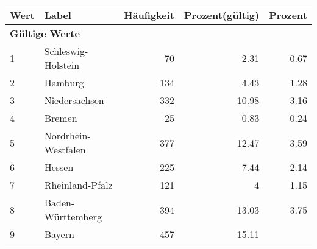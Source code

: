      \begin{longtable}{lXrrr}
     \toprule
     \textbf{Wert} & \textbf{Label} & \textbf{Häufigkeit} & \textbf{Prozent(gültig)} & \textbf{Prozent} \\
     \endhead
     \midrule
     \multicolumn{5}{l}{\textbf{Gültige Werte}}\\
        1 & \multicolumn{1}{X}{Schleswig-Holstein} & %
          \num{70} &
          \num[round-mode=places,round-precision=2]{2.31} &
          \num[round-mode=places,round-precision=2]{0.67} \\
        2 & \multicolumn{1}{X}{Hamburg} & %
          \num{134} &
          \num[round-mode=places,round-precision=2]{4.43} &
          \num[round-mode=places,round-precision=2]{1.28} \\
        3 & \multicolumn{1}{X}{Niedersachsen} & %
          \num{332} &
          \num[round-mode=places,round-precision=2]{10.98} &
          \num[round-mode=places,round-precision=2]{3.16} \\
        4 & \multicolumn{1}{X}{Bremen} & %
          \num{25} &
          \num[round-mode=places,round-precision=2]{0.83} &
          \num[round-mode=places,round-precision=2]{0.24} \\
        5 & \multicolumn{1}{X}{Nordrhein-Westfalen} & %
          \num{377} &
          \num[round-mode=places,round-precision=2]{12.47} &
          \num[round-mode=places,round-precision=2]{3.59} \\
        6 & \multicolumn{1}{X}{Hessen} & %
          \num{225} &
          \num[round-mode=places,round-precision=2]{7.44} &
          \num[round-mode=places,round-precision=2]{2.14} \\
        7 & \multicolumn{1}{X}{Rheinland-Pfalz} & %
          \num{121} &
          \num[round-mode=places,round-precision=2]{4} &
          \num[round-mode=places,round-precision=2]{1.15} \\
        8 & \multicolumn{1}{X}{Baden-Württemberg} & %
          \num{394} &
          \num[round-mode=places,round-precision=2]{13.03} &
          \num[round-mode=places,round-precision=2]{3.75} \\
        9 & \multicolumn{1}{X}{Bayern} & %
          \num{457} &
          \num[round-mode=places,round-precision=2]{15.11} &

\end{longtable}
